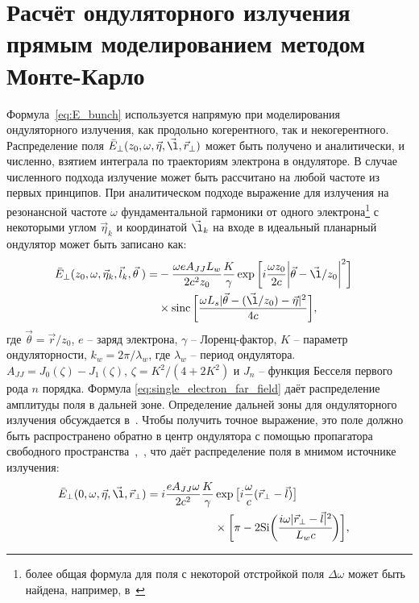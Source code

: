 \section{Расчёт ондуляторного излучения прямым моделированием методом Монте-Карло}
Формула~\ref{eq:E_bunch} используется напрямую при моделирования ондуляторного излучения, как продольно когерентного, так и некогерентного. Распределение поля $\bar{E}_{\bot}(z_0, \omega, \vec{\eta}, \vec{\l}, \vec{r}_{\bot})$ может быть получено и аналитически, и численно, взятием интеграла по траекториям электрона в ондуляторе. В случае численного подхода излучение может быть рассчитано на любой частоте из первых принципов. При аналитическом подходе выражение для излучения на резонансной частоте $\omega$ фундаментальной гармоники от одного электрона\footnote{более общая формула для поля с некоторой отстройкой поля $\Delta \omega$ может быть найдена, например, в~\cite{onuki_undulators_2003}} с некоторыми углом $\vec{\eta}_k$ и координатой $\vec{\l}_k$ на входе в идеальный планарный ондулятор может быть записано как: 
\begin{align}
	\bar{E}_{\bot}(z_0, \omega, \vec{\eta}_k, \vec{l}_k, \vec{\theta} \;) =
&	-\frac{\omega e A_{JJ} L_w}{2c^2z_0}\frac{K}{\gamma}\exp{\bigg[i \frac{\omega z_0}{2c} \bigg|\vec{\theta} - \vec{\l}/z_0\bigg|^2 \bigg]} \cr & \times \sinc \bigg[\frac{\omega L_s |\vec{\theta} - (\vec{\l}/z_0) - \vec{\eta}|^2}{4c}\bigg],
	\label{eq:single_electron_far_field}
\end{align}
где $\vec{\theta} = \vec{r}/z_0$, $e$ -- заряд электрона, $\gamma$ -- Лоренц-фактор, $K$ -- параметр ондуляторности, $k_w = 2 \pi / \lambda_w$, где $\lambda_w$ -- период ондулятора. $A_{JJ} = J_0(\zeta) - J_1(\zeta)$, $\zeta = K^2/(4 + 2K^2)$ и $J_n$ -- функция Бесселя первого рода $n$ порядка. Формула \ref{eq:single_electron_far_field} даёт распределение амплитуды поля в дальней зоне. Определение дальней зоны для ондуляторного излучения обсуждается в~\cite{geloni_fourier_2007}. Чтобы получить точное выражение, это поле должно быть распространено обратно в центр ондулятора с помощью пропагатора свободного пространства~\cite{voelz_computational_2011},~\cite{schmidt_numerical_2010}, что даёт распределение поля в мнимом источнике излучения:
\begin{align}
	\bar{E}_{\bot}(0, \omega, \vec{\eta}, \vec{\l}, \vec{r}_{\bot}) =
	i \frac{e A_{JJ} \omega}{2 c^2}\frac{K}{\gamma} &\exp{\big[i \frac{\omega}{c} (\vec{r}_{\bot} - \vec{l})\big]}\cr & \times \bigg [\pi - 2\text{Si} \bigg( \cfrac{i \omega |\vec{r}_{\bot} - \vec{l}|^2}{L_w c}\bigg)\bigg], 
	\label{eq:single_electron_near_field_z=0}
\end{align}
